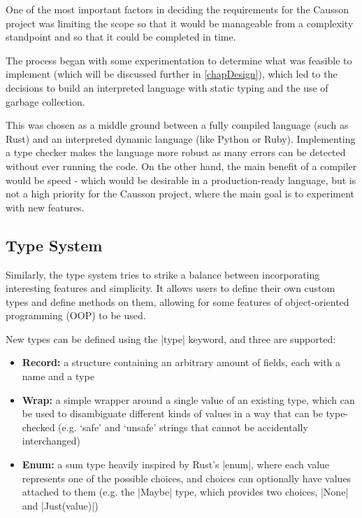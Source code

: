\documentclass[11pt]{report}
\begin{document}
One of the most important factors in deciding the requirements for the Causson project was limiting the scope so that it would be manageable from a complexity standpoint and so that it could be completed in time.

The process began with some experimentation to determine what was feasible to implement (which will be discussed further in \cref{chapDesign}), which led to the decisions to build an interpreted language with static typing and the use of garbage collection.

This was chosen as a middle ground between a fully compiled language (such as Rust) and an interpreted dynamic language (like Python or Ruby). Implementing a type checker makes the language more robust as many errors can be detected without ever running the code. On the other hand, the main benefit of a compiler would be speed - which would be desirable in a production-ready language, but is not a high priority for the Causson project, where the main goal is to experiment with new features.

\subsection{Type System} \label{secTypeSystem}

Similarly, the type system tries to strike a balance between incorporating interesting features and simplicity. It allows users to define their own custom types and define methods on them, allowing for some features of object-oriented programming (OOP) to be used.

New types can be defined using the |type| keyword, and three are supported:

\begin{itemize}[topsep=0pt]
    \item \textbf{Record:} a structure containing an arbitrary amount of fields, each with a name and a type
    
    \item \textbf{Wrap:} a simple wrapper around a single value of an existing type, which can be used to disambiguate different kinds of values in a way that can be type-checked (e.g. `safe' and `unsafe' strings that cannot be accidentally interchanged)
    
    \item \textbf{Enum:} a sum type heavily inspired by Rust's |enum|, where each value represents one of the possible choices, and choices can optionally have values attached to them (e.g. the |Maybe| type, which provides two choices, |None| and |Just(value)|)
\end{itemize}
\end{document}
